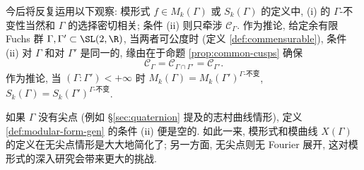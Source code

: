 \begin{remark}\label{rem:common-cusps}
	今后将反复运用以下观察: 模形式 $f \in M_k(\Gamma)$ 或 $S_k(\Gamma)$ 的定义中, (i) 的 $\Gamma$-不变性当然和 $\Gamma$ 的选择密切相关; 条件 (ii) 则只牵涉 $\mathcal{C}_\Gamma$. 作为推论, 给定余有限 Fuchs 群 $\Gamma, \Gamma' \subset \SL(2,\R)$, 当两者可公度时 (定义 \ref{def:commensurable}), 条件 (ii) 对 $\Gamma$ 和对 $\Gamma'$ 是同一的, 缘由在于命题 \ref{prop:common-cusps} 确保
	\[ \mathcal{C}_\Gamma = \mathcal{C}_{\Gamma \cap \Gamma'} = \mathcal{C}_{\Gamma'}. \]
	作为推论, 当 $(\Gamma:\Gamma') < +\infty$ 时 $M_k(\Gamma) = M_k(\Gamma')^{\Gamma\text{-不变}}$, $S_k(\Gamma) = S_k(\Gamma')^{\Gamma\text{-不变}}$.
\end{remark}

\begin{remark}
	如果 $\Gamma$ 没有尖点 (例如 \S\ref{sec:quaternion} 提及的志村曲线情形), 定义 \ref{def:modular-form-gen} 的条件 (ii) 便是空的. 如此一来, 模形式和模曲线 $X(\Gamma)$ 的定义在无尖点情形是大大地简化了; 另一方面, 无尖点则无 Fourier 展开, 这对模形式的深入研究会带来更大的挑战.
\end{remark}

